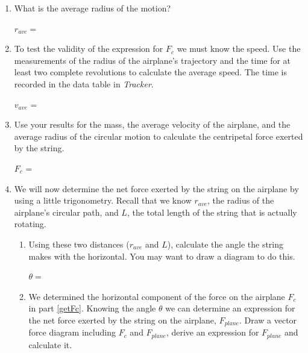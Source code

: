 \begin{enumerate}
\item What is the average radius of the motion? \\
\vspace{2mm}

\hspace{0.5in} $r_{ave} =$

\vspace{5mm}

\item To test the validity of the expression for \( F_{c} \) we must know the
speed. Use the measurements of the radius of the airplane's trajectory and the
time for at least two complete revolutions to calculate the average speed.
The time is recorded in the data table in {\it Tracker}.
\vspace{5mm}

\hspace{0.5in} \( v_{ave} \) = 
\vspace{5mm}

\newpage

\item Use your results for the mass, the average velocity of the airplane, and
the average radius of the circular motion to calculate the centripetal force exerted by
the string.\label{getFc}
\vspace{5mm}

\hspace{0.5in} \( F_{c} \) = 
\vspace{5mm}

\item We will now determine the net force exerted by the string on the airplane
by using a little trigonometry.
Recall that we know $r_{ave}$, the radius of the airplane's circular path, and 
$L$, the total length of the string that is actually rotating. 

\begin{enumerate}
\item Using these two distances ($r_{ave}$ and $L$), 
calculate the angle the string makes with
the horizontal. You may want to draw a diagram to do this. \\
\vspace{5mm}

\( \theta  =\)  \vspace{5mm}

\item We determined the horizontal component of the force on the airplane 
\( F_{c} \) in part \ref{getFc}. Knowing the angle \( \theta \) we can determine an
expression for the
net force exerted by the string on the airplane, \( F_{plane} \). Draw a vector
force diagram including \( F_{c} \) and \( F_{plane} \), derive an expression
for \( F_{plane} \) and calculate it. \\
\vspace{5mm}


\end{enumerate}
\end{enumerate}
